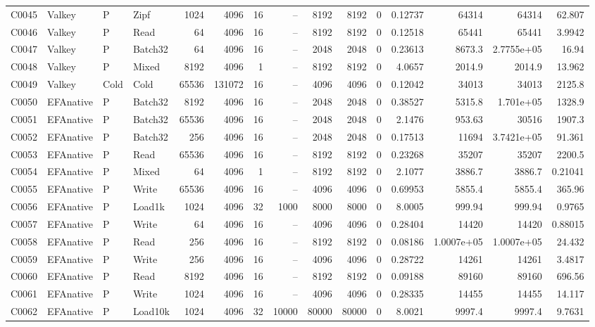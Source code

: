 \begin{landscape}
\begin{longtable}{llllrrrrrrrrrrr}
C0045 & Valkey & P & Zipf & 1024 & 4096 & 16 & -- & 8192 & 8192 & 0 & 0.12737 & 64314 & 64314 & 62.807\\
C0046 & Valkey & P & Read & 64 & 4096 & 16 & -- & 8192 & 8192 & 0 & 0.12518 & 65441 & 65441 & 3.9942\\
C0047 & Valkey & P & Batch32 & 64 & 4096 & 16 & -- & 2048 & 2048 & 0 & 0.23613 & 8673.3 & 2.7755e+05 & 16.94\\
C0048 & Valkey & P & Mixed & 8192 & 4096 & 1 & -- & 8192 & 8192 & 0 & 4.0657 & 2014.9 & 2014.9 & 13.962\\
C0049 & Valkey & Cold & Cold & 65536 & 131072 & 16 & -- & 4096 & 4096 & 0 & 0.12042 & 34013 & 34013 & 2125.8\\
C0050 & EFAnative & P & Batch32 & 8192 & 4096 & 16 & -- & 2048 & 2048 & 0 & 0.38527 & 5315.8 & 1.701e+05 & 1328.9\\
C0051 & EFAnative & P & Batch32 & 65536 & 4096 & 16 & -- & 2048 & 2048 & 0 & 2.1476 & 953.63 & 30516 & 1907.3\\
C0052 & EFAnative & P & Batch32 & 256 & 4096 & 16 & -- & 2048 & 2048 & 0 & 0.17513 & 11694 & 3.7421e+05 & 91.361\\
C0053 & EFAnative & P & Read & 65536 & 4096 & 16 & -- & 8192 & 8192 & 0 & 0.23268 & 35207 & 35207 & 2200.5\\
C0054 & EFAnative & P & Mixed & 64 & 4096 & 1 & -- & 8192 & 8192 & 0 & 2.1077 & 3886.7 & 3886.7 & 0.21041\\
C0055 & EFAnative & P & Write & 65536 & 4096 & 16 & -- & 4096 & 4096 & 0 & 0.69953 & 5855.4 & 5855.4 & 365.96\\
C0056 & EFAnative & P & Load1k & 1024 & 4096 & 32 & 1000 & 8000 & 8000 & 0 & 8.0005 & 999.94 & 999.94 & 0.9765\\
C0057 & EFAnative & P & Write & 64 & 4096 & 16 & -- & 4096 & 4096 & 0 & 0.28404 & 14420 & 14420 & 0.88015\\
C0058 & EFAnative & P & Read & 256 & 4096 & 16 & -- & 8192 & 8192 & 0 & 0.08186 & 1.0007e+05 & 1.0007e+05 & 24.432\\
C0059 & EFAnative & P & Write & 256 & 4096 & 16 & -- & 4096 & 4096 & 0 & 0.28722 & 14261 & 14261 & 3.4817\\
C0060 & EFAnative & P & Read & 8192 & 4096 & 16 & -- & 8192 & 8192 & 0 & 0.09188 & 89160 & 89160 & 696.56\\
C0061 & EFAnative & P & Write & 1024 & 4096 & 16 & -- & 4096 & 4096 & 0 & 0.28335 & 14455 & 14455 & 14.117\\
C0062 & EFAnative & P & Load10k & 1024 & 4096 & 32 & 10000 & 80000 & 80000 & 0 & 8.0021 & 9997.4 & 9997.4 & 9.7631\\

\end{longtable}
\end{landscape}
